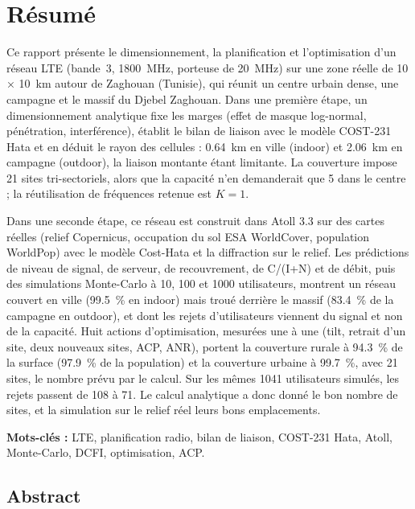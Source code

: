 \chapter*{Résumé}

Ce rapport présente le dimensionnement, la planification et l'optimisation d'un réseau LTE (bande~3, \SI{1800}{\mega\hertz}, porteuse de \SI{20}{\mega\hertz}) sur une zone réelle de \num{10} × \SI{10}{\kilo\metre} autour de Zaghouan (Tunisie), qui réunit un centre urbain dense, une campagne et le massif du Djebel Zaghouan. Dans une première étape, un dimensionnement analytique fixe les marges (effet de masque log-normal, pénétration, interférence), établit le bilan de liaison avec le modèle COST-231 Hata et en déduit le rayon des cellules : \SI{0,64}{\kilo\metre} en ville (indoor) et \SI{2,06}{\kilo\metre} en campagne (outdoor), la liaison montante étant limitante. La couverture impose 21 sites tri-sectoriels, alors que la capacité n'en demanderait que 5 dans le centre ; la réutilisation de fréquences retenue est $K = 1$.

Dans une seconde étape, ce réseau est construit dans Atoll 3.3 sur des cartes réelles (relief Copernicus, occupation du sol ESA WorldCover, population WorldPop) avec le modèle Cost-Hata et la diffraction sur le relief. Les prédictions de niveau de signal, de serveur, de recouvrement, de C/(I+N) et de débit, puis des simulations Monte-Carlo à 10, 100 et \num{1000} utilisateurs, montrent un réseau couvert en ville (\SI{99,5}{\percent} en indoor) mais troué derrière le massif (\SI{83,4}{\percent} de la campagne en outdoor), et dont les rejets d'utilisateurs viennent du signal et non de la capacité. Huit actions d'optimisation, mesurées une à une (tilt, retrait d'un site, deux nouveaux sites, ACP, ANR), portent la couverture rurale à \SI{94,3}{\percent} de la surface (\SI{97,9}{\percent} de la population) et la couverture urbaine à \SI{99,7}{\percent}, avec 21 sites, le nombre prévu par le calcul. Sur les mêmes \num{1041} utilisateurs simulés, les rejets passent de 108 à 71. Le calcul analytique a donc donné le bon nombre de sites, et la simulation sur le relief réel leurs bons emplacements.

\medskip
\textbf{Mots-clés :} LTE, planification radio, bilan de liaison, COST-231 Hata, Atoll, Monte-Carlo, DCFI, optimisation, ACP.

\vspace{2em}
\section*{Abstract}

